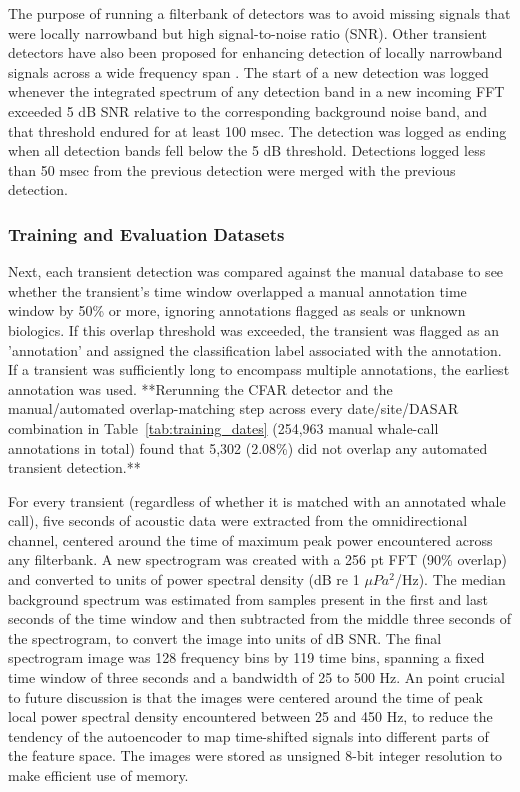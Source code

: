 \documentclass[preprint,NumberedRefs]{JASAnew}
\begin{document}
The purpose of running a filterbank of detectors was to avoid missing signals that were locally narrowband but high signal-to-noise ratio (SNR).  Other transient detectors have also been proposed for enhancing detection of locally narrowband signals across a wide frequency span \cite{wang2001all, helble2012generalized}.
The start of a new detection was logged whenever the integrated spectrum of any detection band in a new incoming FFT exceeded 5 dB SNR relative to the corresponding background noise band, and that threshold endured for at least 100 msec.  The detection was logged as ending when all detection bands fell below the 5 dB threshold.  Detections logged less than 50 msec from the previous detection were merged with the previous detection.

\subsubsection{Training and Evaluation Datasets}
\label{sec:Training Dataset Construction}
Next, each transient detection was compared against the manual database to see whether the transient's time window overlapped a manual annotation time window by 50\% or more, ignoring annotations flagged as seals or unknown biologics.  If this overlap threshold was exceeded, the transient was flagged as an 'annotation' and assigned the classification label associated with the annotation.  If a transient was sufficiently long to encompass multiple annotations, the earliest annotation was used.  **Rerunning the CFAR detector and the manual/automated overlap-matching step across every date/site/DASAR combination in Table~\ref{tab:training_dates} (254,963 manual whale-call annotations in total) found that 5,302 (2.08\%) did not overlap any automated transient detection.**

For every transient (regardless of whether it is matched with an annotated whale call), five seconds of acoustic data were extracted from the omnidirectional channel, centered around the time of maximum peak power encountered across any filterbank.  A new spectrogram was created with a 256 pt FFT (90\% overlap) and converted to units of power spectral density (dB re 1 $\mu Pa^2$/Hz).  The median background spectrum was estimated from samples present in the first and last seconds of the time window and then subtracted from the middle three seconds of the spectrogram, to convert the image into units of dB SNR.  The final spectrogram image was 128 frequency bins by 119 time bins, spanning a fixed time window of three seconds and a bandwidth of 25 to 500 Hz.  An point crucial to future discussion is that the images were centered around the time of peak local power spectral density encountered between 25 and 450 Hz, to reduce the tendency of the autoencoder to map time-shifted signals into different parts of the feature space.  The images were stored as unsigned 8-bit integer resolution to make efficient use of memory.
\end{document}
